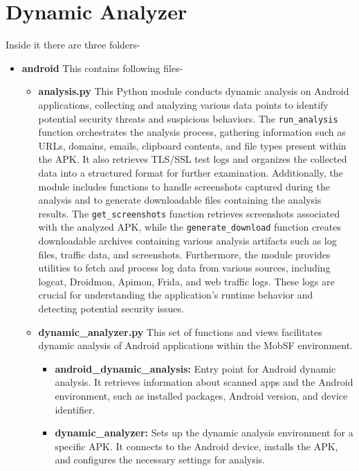 \documentclass{report}
\begin{document}
\section{Dynamic Analyzer}
Inside it there are three folders-
\begin{itemize}
    \item \textbf{android}
    This contains following files-
    \begin{itemize}
        \item \textbf{analysis.py}
        This Python module conducts dynamic analysis on Android applications, collecting and analyzing various data points to identify potential security threats and suspicious behaviors.\newline
        The \texttt{run\_analysis} function orchestrates the analysis process, gathering information such as URLs, domains, emails, clipboard contents, and file types present within the APK. It also retrieves TLS/SSL test logs and organizes the collected data into a structured format for further examination.\newline       
        Additionally, the module includes functions to handle screenshots captured during the analysis and to generate downloadable files containing the analysis results. The \texttt{get\_screenshots} function retrieves screenshots associated with the analyzed APK, while the \texttt{generate\_download} function creates downloadable archives containing various analysis artifacts such as log files, traffic data, and screenshots.\newline        
        Furthermore, the module provides utilities to fetch and process log data from various sources, including logcat, Droidmon, Apimon, Frida, and web traffic logs. These logs are crucial for understanding the application's runtime behavior and detecting potential security issues.
        \item \textbf{dynamic\_analyzer.py}
        This set of functions and views facilitates dynamic analysis of Android applications within the MobSF environment.
        \begin{itemize}
            
            \item \textbf{android\_dynamic\_analysis:} Entry point for Android dynamic analysis. It retrieves information about scanned apps and the Android environment, such as installed packages, Android version, and device identifier.
            
            \item \textbf{dynamic\_analyzer:} Sets up the dynamic analysis environment for a specific APK. It connects to the Android device, installs the APK, and configures the necessary settings for analysis.
            

\end{itemize}
\end{itemize}
\end{itemize}
\end{document}
